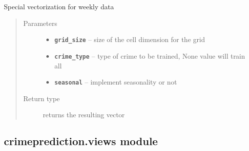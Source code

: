 \documentclass[letterpaper,10pt,english]{sphinxmanual}
\begin{document}

\begin{fulllineitems}
\label{api/crimeprediction:crimeprediction.vectorize.vectorize_weekly}
Special vectorization for weekly data
\begin{quote}\begin{description}
\item[{Parameters}] \leavevmode\begin{itemize}
\item {} 
\textbf{\texttt{grid\_size}} -- size of the cell dimension for the grid

\item {} 
\textbf{\texttt{crime\_type}} -- type of crime to be trained, None value will
train all

\item {} 
\textbf{\texttt{seasonal}} -- implement seasonality or not

\end{itemize}

\item[{Return type}] \leavevmode
returns the resulting vector

\end{description}\end{quote}

\end{fulllineitems}



\subsection{crimeprediction.views module}
\label{api/crimeprediction:module-crimeprediction.views}\label{api/crimeprediction:crimeprediction-views-module}
\end{document}
